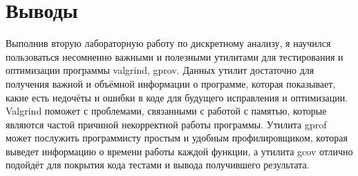 \section{Выводы}
Выполнив вторую лабораторную работу по дискретному анализу, я научился пользоваться несомненно важными и полезными утилитами для тестирования и оптимизации программы valgrind, gprov.
Данных утилит достаточно для получения важной и объёмной информации о программе, которая показывает, какие есть недочёты и ошибки в коде для будущего исправления и оптимизации.
Valgrind поможет с проблемами, связанными с работой с памятью, которые являются частой причиной некорректной работы программы.
Утилита gprof может послужить программисту простым и удобным профилировщиком, которая выведет информацию о времени работы каждой функции, а утилита gcov отлично подойдёт для покрытия кода
тестами и вывода получившего результата.
\pagebreak

